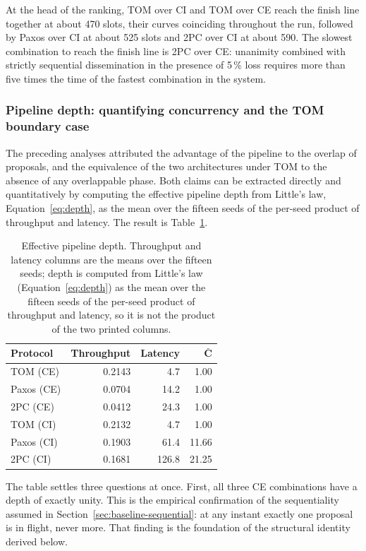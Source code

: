 \documentclass[journal]{IEEEtran}
\newcommand{\CI}{CI}                      %
\newcommand{\CE}{CE}                      %
\newcommand{\Cdepth}{\bar{C}}             %
\begin{document}
At the head of the ranking, TOM over \CI{} and TOM over \CE{} reach the
finish line together at about 470 slots, their curves coinciding
throughout the run, followed by Paxos over \CI{} at about 525 slots and
2PC over \CI{} at about 590. The slowest combination to reach the finish
line is 2PC over \CE: unanimity combined with strictly sequential
dissemination in the presence of 5\,\% loss requires more than five times
the time of the fastest combination in the system.

\subsubsection{Pipeline depth: quantifying concurrency and the TOM
boundary case}

The preceding analyses attributed the advantage of the pipeline to the
overlap of proposals, and the equivalence of the two architectures under
TOM to the absence of any overlappable phase. Both claims can be extracted
directly and quantitatively by computing the effective pipeline depth from
Little's law, Equation~\eqref{eq:depth}, as the mean over the fifteen seeds
of the per-seed product of throughput and latency. The result is
Table~\ref{tab:depth}.

\begin{table}[!t]
\caption{Effective pipeline depth. Throughput and latency columns are the
means over the fifteen seeds; depth is computed from Little's law
(Equation~\eqref{eq:depth}) as the mean over the fifteen seeds of the
per-seed product of throughput and latency, so it is not the product of the
two printed columns.}
\label{tab:depth}
\centering
\footnotesize
\begin{tabular}{@{}lrrr@{}}
\toprule
\textbf{Protocol} & \textbf{Throughput} & \textbf{Latency} &
$\boldsymbol{\Cdepth}$ \\
\midrule
TOM (\CE)   & 0.2143 & 4.7   & 1.00 \\
Paxos (\CE) & 0.0704 & 14.2  & 1.00 \\
2PC (\CE)   & 0.0412 & 24.3  & 1.00 \\
\addlinespace
TOM (\CI)   & 0.2132 & 4.7   & 1.00 \\
Paxos (\CI) & 0.1903 & 61.4  & 11.66 \\
2PC (\CI)   & 0.1681 & 126.8 & 21.25 \\
\bottomrule
\end{tabular}
\end{table}

The table settles three questions at once. First, all three \CE{}
combinations have a depth of exactly unity. This is the empirical
confirmation of the sequentiality assumed in
Section~\ref{sec:baseline-sequential}: at any instant exactly one proposal
is in flight, never more. That finding is the foundation of the structural
identity derived below.
\end{document}

